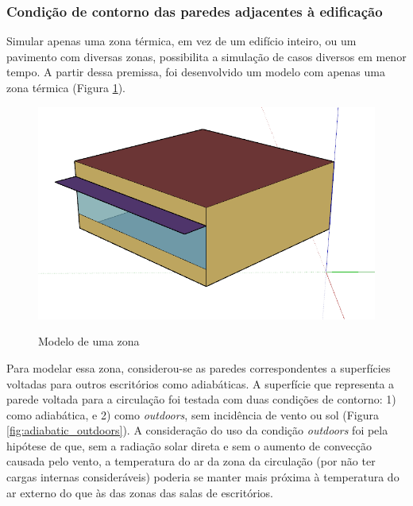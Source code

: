 \documentclass[brazil,hardcopy,openany,a5paper]{ufscthesis}
\begin{document}
		\subsubsection{Condição de contorno das paredes adjacentes à edificação}
		
		Simular apenas uma zona térmica, em vez de um edifício inteiro, ou um pavimento com diversas zonas, possibilita a simulação de casos diversos em menor tempo.
		A partir dessa premissa, foi desenvolvido um modelo com apenas uma zona térmica (Figura \ref{fig:singlezone}).
		
		\begin{figure}[h]
			\centering
			\caption{Modelo de uma zona}
			\includegraphics[width=1\linewidth]{img/model.PNG}
			\label{fig:singlezone}
		\end{figure}
		
		Para modelar essa zona, considerou-se as paredes correspondentes a superfícies voltadas para outros escritórios como adiabáticas. A superfície que representa a parede voltada para a circulação foi testada com duas condições de contorno: 1) como adiabática, e 2) como \textit{outdoors}, sem incidência de vento ou sol (Figura \ref{fig:adiabatic_outdoors}).	
		A consideração do uso da condição \textit{outdoors} foi pela hipótese de que, sem a radiação solar direta e sem o aumento de convecção causada pelo vento, a temperatura do ar da zona da circulação (por não ter cargas internas consideráveis) poderia se manter mais próxima à temperatura do ar externo do que às das zonas das salas de escritórios.
		
\end{document}
